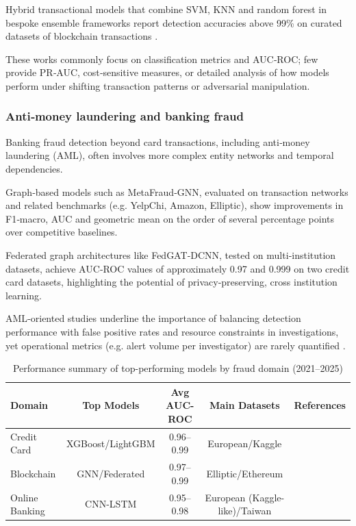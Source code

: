 \documentclass[a4paper,fleqn]{cas-dc}
\begin{document}
Hybrid transactional models that combine SVM, KNN and random forest in bespoke ensemble frameworks report detection accuracies above 99\% on curated datasets of blockchain transactions \cite{alutaibi_blockchain_2025}.

These works commonly focus on classification metrics and AUC‑ROC; few provide PR‑AUC, cost‑sensitive measures, or detailed analysis of how models perform under shifting transaction patterns or adversarial manipulation.

\subsubsection{Anti‑money laundering and banking fraud}
Banking fraud detection beyond card transactions, including anti‑money laundering (AML), often involves more complex entity networks and temporal dependencies.

Graph‑based models such as MetaFraud‑GNN, evaluated on transaction networks and related benchmarks (e.g. YelpChi, Amazon, Elliptic), show improvements in F1‑macro, AUC and geometric mean on the order of several percentage points over competitive baselines.

Federated graph architectures like FedGAT‑DCNN, tested on multi‑institution datasets, achieve AUC‑ROC values of approximately 0.97 and 0.999 on two credit card datasets, highlighting the potential of privacy‑preserving, cross institution learning.

AML‑oriented studies underline the importance of balancing detection performance with false positive rates and resource constraints in investigations, yet operational metrics (e.g. alert volume per investigator) are rarely quantified \cite{wu_enhanced_2024}.

\begin{table}[htbp]
\centering
\caption{Performance summary of top-performing models by fraud domain (2021--2025)}
\label{tab:synthesis-performance}
\smallskip
\begin{tabular}{lcccc}
\toprule
\textbf{Domain} & \textbf{Top Models} & \textbf{Avg AUC-ROC} & \textbf{Main Datasets} & \textbf{References} \\
\midrule
Credit Card & XGBoost/LightGBM & 0.96--0.99 & European/Kaggle & \cite{alsowail_optimizing_2025, zhao_improved_2024} \\
Blockchain & GNN/Federated & 0.97--0.99 & Elliptic/Ethereum & \cite{baabdullah_efficiency_2024} \\
Online Banking & CNN-LSTM & 0.95--0.98 & European (Kaggle-like)/Taiwan  & \cite{ileberi_hybrid_2024} \\
\bottomrule
\end{tabular}
\end{table}
\end{document}
